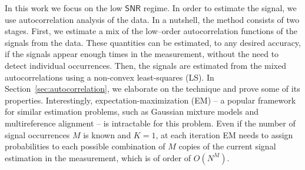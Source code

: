 \documentclass[english,11pt]{article}
\numberwithin{equation}{section}
\theoremstyle{plain}
\theoremstyle{definition}
\theoremstyle{remark}
\theoremstyle{plain}
\theoremstyle{remark}
\theoremstyle{plain}
\theoremstyle{plain}
\newcommand{\SNR}{{\textsf{SNR}}}
\begin{document}
In this work we focus on the low $\SNR$ regime. In order to estimate the signal, we use autocorrelation analysis of the data. 
In a nutshell, the method consists of two stages. First, we estimate a mix of the low--order autocorrelation functions of the signals from the data. These quantities can be estimated, to any desired accuracy, if the signals appear enough times in the measurement, without the need to detect individual occurrences. Then, the signals are estimated from the mixed autocorrelations using a non-convex least-squares (LS).
In Section~\ref{sec:autocorrelation}, we elaborate on the technique and prove some of its properties.
Interestingly, expectation-maximization (EM) --  a popular framework for similar estimation problems, such as Gaussian mixture models and multireference alignment -- is intractable for this problem. Even if the number of signal occurrences $M$ is known and $K=1$, at each iteration 
EM needs to assign probabilities to each possible combination of  $M$ copies of the current signal estimation in the measurement, which is of order of $O(N^M)$.
\end{document}
